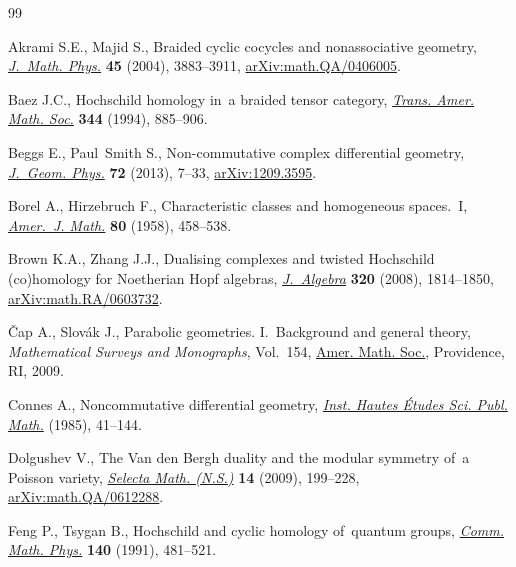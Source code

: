 \begin{thebibliography}{99}
\footnotesize\itemsep=0pt

Akrami S.E., Majid S., Braided cyclic cocycles and nonassociative geometry,
 \href{https://doi.org/10.1063/1.1787621}{\textit{J.~Math. Phys.}} \textbf{45} (2004), 3883--3911,
 \href{https://arxiv.org/abs/math.QA/0406005}{arXiv:math.QA/0406005}.

Baez J.C., Hoch\-schild homology in~a braided tensor category, \href{https://doi.org/10.2307/2154514}{\textit{Trans.
 Amer. Math. Soc.}} \textbf{344} (1994), 885--906.

Beggs E., Paul~Smith S., Non-commutative complex differential geometry,
 \href{https://doi.org/10.1016/j.geomphys.2013.03.018}{\textit{J.~Geom. Phys.}} \textbf{72} (2013), 7--33, \href{https://arxiv.org/abs/1209.3595}{arXiv:1209.3595}.

Borel A., Hirzebruch F., Characteristic classes and homogeneous spaces.~{I},
 \href{https://doi.org/10.2307/2372795}{\textit{Amer.~J. Math.}} \textbf{80} (1958), 458--538.

Brown K.A., Zhang J.J., Dualising complexes and twisted {H}ochschild
 (co)homology for {N}oetherian {H}opf algebras, \href{https://doi.org/10.1016/j.jalgebra.2007.03.050}{\textit{J.~Algebra}}
 \textbf{320} (2008), 1814--1850, \href{https://arxiv.org/abs/math.RA/0603732}{arXiv:math.RA/0603732}.


\v{C}ap A., Slov\'ak J., Parabolic geometries. {I}.~Background and general
 theory, \textit{Mathematical Surveys and Monographs}, Vol.~154, \href{https://doi.org/10.1090/surv/154}{Amer. Math.
 Soc.}, Providence, RI, 2009.

Connes A., Noncommutative differential geometry, \href{https:////doi.org/10.1007/BF02698807}{\textit{Inst. Hautes
 \'Etudes Sci. Publ. Math.}} (1985), 41--144.

Dolgushev V., The {V}an den {B}ergh duality and the modular symmetry of~a
 {P}oisson variety, \href{https://doi.org/10.1007/s00029-008-0062-z}{\textit{Selecta Math. (N.S.)}} \textbf{14} (2009),
 199--228, \href{https://arxiv.org/abs/math.QA/0612288}{arXiv:math.QA/0612288}.

Feng P., Tsygan B., Hoch\-schild and cyclic homology of~quantum groups,
 \href{https://doi.org/doi.org/10.1007/BF02099132}{\textit{Comm. Math. Phys.}} \textbf{140} (1991), 481--521.


\end{thebibliography}
